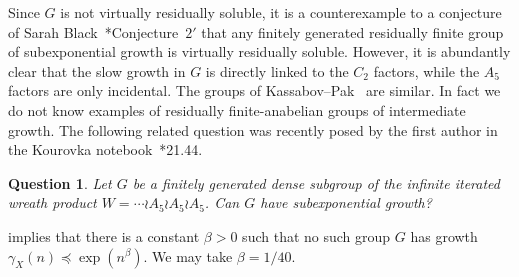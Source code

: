 \documentclass[11pt,reqno]{amsart}
\numberwithin{equation}{section}
\newtheorem*{question}{Question}
\theoremstyle{definition}
\theoremstyle{remark}
\numberwithin{equation}{section}
\begin{document}
Since $G$ is not virtually residually soluble, it is a counterexample to a conjecture of Sarah Black~\cite{black}*{Conjecture~$2'$} that any finitely generated residually finite group of subexponential growth is virtually residually soluble.
However, it is abundantly clear that the slow growth in $G$ is directly linked to the $C_2$ factors,
while the $A_5$ factors are only incidental.
The groups of Kassabov--Pak~\cite{kassabov-pak} are similar.
In fact we do not know examples of residually finite-anabelian groups of intermediate growth.
The following related question was recently posed by the first author in the Kourovka notebook~\cite{kourovka}*{21.44}.

\begin{question}
    Let $G$ be a finitely generated dense subgroup of the infinite iterated wreath product $W = \cdots \wr A_5 \wr A_5 \wr A_5$.
    Can $G$ have subexponential growth?
\end{question}

 implies that there is a constant $\beta > 0$ such that no such group $G$ has growth $\gamma_X(n) \preceq \exp(n^\beta)$.
We may take $\beta = 1 / 40$.



\end{document}
